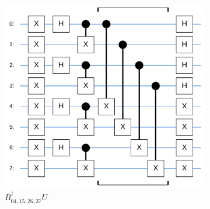\documentclass[a4paper,11pt,aps,tightenlines,nofootinbib]{revtex4}
\begin{document}
        \begin{figure}[h] \label{dipole-topology}
                \begin{subfigure}[b]{.4\textwidth}
                \includegraphics[scale=.2]{images/dipole_disjoint_circuit.png}
                \caption{$B^\dagger_{04,15,26,37}U$ \cite{cirq}}
                \end{subfigure}
                \begin{subfigure}[b]{.3\textwidth}

\end{subfigure}
\end{figure}
\end{document}
